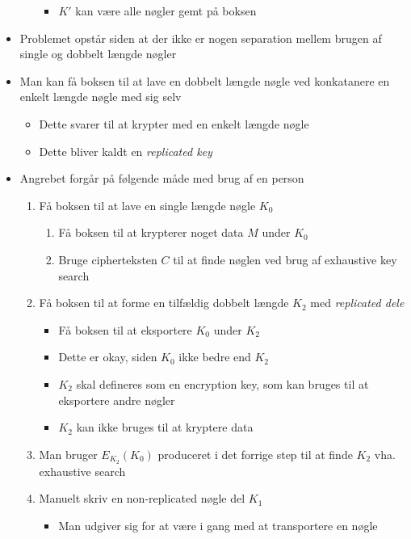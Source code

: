 \documentclass[a4, english]{article}
\begin{document}
\begin{itemize}
\begin{itemize}
    \begin{itemize}
    	\item $K'$ kan være alle nøgler gemt på boksen
    \end{itemize}
  \end{itemize}
  \item Problemet opstår siden at der ikke er nogen separation mellem brugen af single og dobbelt længde nøgler
	\item Man kan få boksen til at lave en dobbelt længde nøgle ved konkatanere en enkelt længde nøgle med sig selv
  \begin{itemize}
  	\item Dette svarer til at krypter med en enkelt længde nøgle
    \item Dette bliver kaldt en \textit{replicated key}
  \end{itemize}
  \item Angrebet forgår på følgende måde med brug af en person
  \begin{enumerate}
  	\item Få boksen til at lave en single længde nøgle $K_0$ 
    \begin{enumerate}
      \item Få boksen til at krypterer noget data $M$ under $K_0$ 
    	\item Bruge cipherteksten $C$ til at finde nøglen ved brug af exhaustive key search
    \end{enumerate}
    \item Få boksen til at forme en tilfældig dobbelt længde $K_2$ med \textit{replicated dele}
    \begin{itemize}
    	\item Få boksen til at eksportere $K_0$ under $K_2$     
      \item Dette er okay, siden $K_0$ ikke bedre end $K_2$  
      \item $K_2$ skal defineres som en encryption key, som kan bruges til at eksportere andre nøgler
      \item $K_2$ kan ikke bruges til at kryptere data
    \end{itemize}
    \item Man bruger $E_{K_2}(K_0)$ produceret i det forrige step til at finde $K_2$ vha. exhaustive search 
    \item Manuelt skriv en non-replicated nøgle del $K_1$
    \begin{itemize}
    	\item Man udgiver sig for at være i gang med at transportere en nøgle

\end{itemize}
\end{enumerate}
\end{itemize}
\end{document}
